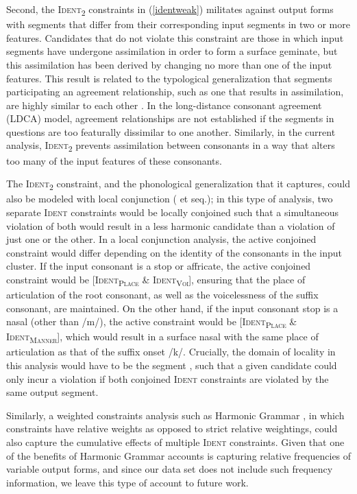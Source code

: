 \documentclass[output=paper]{langscibook}
\begin{document}
Second, the \textsc{Ident\textsubscript{2}} constraints in (\ref{identweak}) militates against output forms with segments that differ from their corresponding input segments in two or more features. Candidates that do not violate this constraint are those in which input segments have undergone assimilation in order to form a surface geminate, but this assimilation has been derived by changing no more than one of the input features. This result is related to the typological generalization that segments participating an agreement relationship, such as one that results in assimilation, are highly similar to each other \citep{rosewalker}. In the \citet{rosewalker} long-distance consonant agreement (LDCA) model, agreement relationships are not established if the segments in questions are too featurally dissimilar to one another. Similarly, in the current analysis, \textsc{Ident\textsubscript{2}} prevents assimilation between consonants in a way that alters too many of the input features of these consonants.

The \textsc{Ident\textsubscript{2}} constraint, and the phonological generalization that it captures, could also be modeled with local conjunction (\citealp{smolenskyLC} et seq.); in this type of analysis, two separate \textsc{Ident} constraints would be locally conjoined such that a simultaneous violation of both would result in a less harmonic candidate than a violation of just one or the other. In a local conjunction analysis, the active conjoined constraint would differ depending on the identity of the consonants in the input cluster. If the input consonant is a stop or affricate, the active conjoined constraint would be [\textsc{Ident\textsubscript{Place}} \& \textsc{Ident\textsubscript{Voi}}], ensuring that the place of articulation of the root consonant, as well as the voicelessness of the suffix consonant, are maintained. On the other hand, if the input consonant stop is a nasal (other than /m/), the active constraint would be [\textsc{Ident\textsubscript{Place}} \& \textsc{Ident\textsubscript{Manner}}], which would result in a surface nasal with the same place of articulation as that of the suffix onset /k/. Crucially, the domain of locality in this analysis would have to be the segment \citep{lubowicz}, such that a given candidate could only incur a violation if both conjoined \textsc{Ident} constraints are violated by the same output segment.

Similarly, a weighted constraints analysis such as Harmonic Grammar \citep{HG}, in which constraints have relative weights as opposed to strict relative weightings, could also capture the cumulative effects of multiple \textsc{Ident} constraints. Given that one of the benefits of Harmonic Grammar accounts is capturing relative frequencies of variable output forms, and since our data set does not include such frequency information, we leave this type of account to future work.
\end{document}

